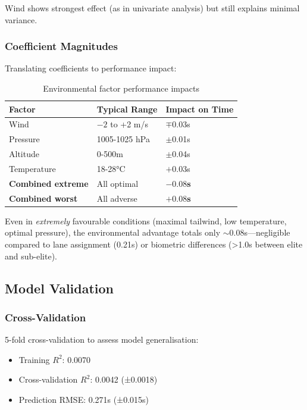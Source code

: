 Wind shows strongest effect (as in univariate analysis) but still explains minimal variance.

\subsubsection{Coefficient Magnitudes}

Translating coefficients to performance impact:

\begin{table}[H]
\centering
\caption{Environmental factor performance impacts}
\begin{tabular}{@{}lll@{}}
\toprule
\textbf{Factor} & \textbf{Typical Range} & \textbf{Impact on Time} \\
\midrule
Wind & $-2$ to +2 m/s & $\mp$0.03s \\
Pressure & 1005-1025 hPa & $\pm$0.01s \\
Altitude & 0-500m & $\pm$0.04s \\
Temperature & 18-28°C & $+0.03$s \\
\midrule
\textbf{Combined extreme} & All optimal & \textbf{$-0.08$s} \\
\textbf{Combined worst} & All adverse & \textbf{$+0.08$s} \\
\bottomrule
\end{tabular}
\end{table}

Even in \textit{extremely} favourable conditions (maximal tailwind, low temperature, optimal pressure), the environmental advantage totals only $\sim$0.08s—negligible compared to lane assignment (0.21s) or biometric differences (>1.0s between elite and sub-elite).

\subsection{Model Validation}

\subsubsection{Cross-Validation}

5-fold cross-validation to assess model generalisation:
\begin{itemize}
    \item Training $R^2$: 0.0070
    \item Cross-validation $R^2$: 0.0042 (±0.0018)
    \item Prediction RMSE: 0.271s (±0.015s)
\end{itemize}

